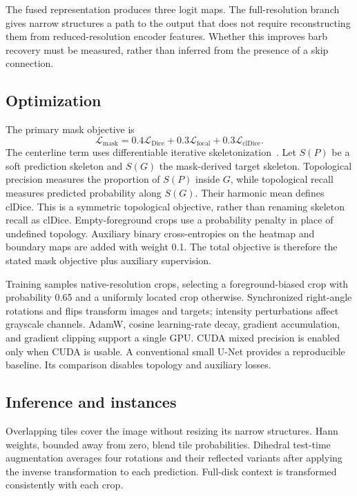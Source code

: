 \documentclass[conference]{IEEEtran}
\begin{document}
The fused representation produces three logit maps. The full-resolution branch gives narrow structures a path to the output that does not require reconstructing them from reduced-resolution encoder features. Whether this improves barb recovery must be measured, rather than inferred from the presence of a skip connection.

\subsection{Optimization}
The primary mask objective is
\begin{equation}
\mathcal L_{\mathrm{mask}}=0.4\mathcal L_{\mathrm{Dice}}+
0.3\mathcal L_{\mathrm{focal}}+0.3\mathcal L_{\mathrm{clDice}}.
\end{equation}
The centerline term uses differentiable iterative skeletonization~\cite{cldice}. Let $S(P)$ be a soft prediction skeleton and $S(G)$ the mask-derived target skeleton. Topological precision measures the proportion of $S(P)$ inside $G$, while topological recall measures predicted probability along $S(G)$. Their harmonic mean defines clDice. This is a symmetric topological objective, rather than renaming skeleton recall as clDice. Empty-foreground crops use a probability penalty in place of undefined topology. Auxiliary binary cross-entropies on the heatmap and boundary maps are added with weight 0.1. The total objective is therefore the stated mask objective plus auxiliary supervision.

Training samples native-resolution crops, selecting a foreground-biased crop with probability 0.65 and a uniformly located crop otherwise. Synchronized right-angle rotations and flips transform images and targets; intensity perturbations affect grayscale channels. AdamW, cosine learning-rate decay, gradient accumulation, and gradient clipping support a single GPU. CUDA mixed precision is enabled only when CUDA is usable. A conventional small U-Net provides a reproducible baseline. Its comparison disables topology and auxiliary losses.

\subsection{Inference and instances}
Overlapping tiles cover the image without resizing its narrow structures. Hann weights, bounded away from zero, blend tile probabilities. Dihedral test-time augmentation averages four rotations and their reflected variants after applying the inverse transformation to each prediction. Full-disk context is transformed consistently with each crop.
\end{document}
